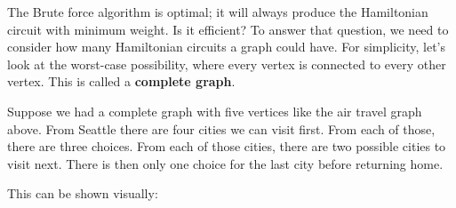 The Brute force algorithm is optimal; it will always produce the Hamiltonian circuit with minimum weight.  Is it efficient?  To answer that question, we need to consider how many Hamiltonian circuits a graph could have.  For simplicity, let's look at the worst-case possibility, where every vertex is connected to every other vertex.  This is called a \textbf{complete graph}.

Suppose we had a complete graph with five vertices like the air travel graph above.  From Seattle there are four cities we can visit first.  From each of those, there are three choices.  From each of those cities, there are two possible cities to visit next.  There is then only one choice for the last city before returning home.  

This can be shown visually:\\

